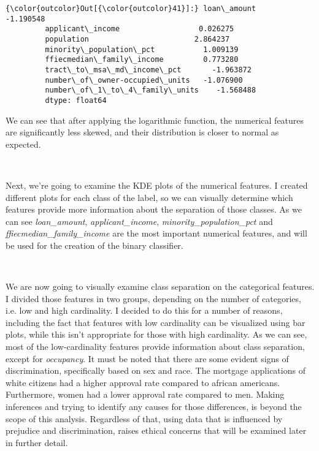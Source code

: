 \documentclass[11pt]{article}
\begin{document}
\begin{Verbatim}[commandchars=\\\{\}]
{\color{outcolor}Out[{\color{outcolor}41}]:} loan\_amount                      -1.190548
         applicant\_income                  0.026275
         population                        2.864237
         minority\_population\_pct           1.009139
         ffiecmedian\_family\_income         0.773280
         tract\_to\_msa\_md\_income\_pct       -1.963872
         number\_of\_owner-occupied\_units   -1.076900
         number\_of\_1\_to\_4\_family\_units    -1.568488
         dtype: float64
\end{Verbatim}
            
    We can see that after applying the logarithmic function, the numerical
features are significantly less skewed, and their distribution is closer
to normal as expected.

    \begin{center}
    \end{center}
    { \hspace*{\fill} \\}
    
    Next, we're going to examine the KDE plots of the numerical features. I
created different plots for each class of the label, so we can visually
determine which features provide more information about the separation
of those classes. As we can see \emph{loan\_amount},
\emph{applicant\_income}, \emph{minority\_population\_pct} and
\emph{ffiecmedian\_family\_income} are the most important numerical
features, and will be used for the creation of the binary classifier.

    \begin{center}
    \end{center}
    { \hspace*{\fill} \\}
    
    We are now going to visually examine class separation on the categorical
features. I divided those features in two groups, depending on the
number of categories, i.e. low and high cardinality. Ι decided to do
this for a number of reasons, including the fact that features with low
cardinality can be visualized using bar plots, while this isn't
appropriate for those with high cardinality. As we can see, most of the
low-cardinality features provide information about class separation,
except for \emph{occupancy}. It must be noted that there are some
evident signs of discrimination, specifically based on sex and race. The
mortgage applications of white citizens had a higher approval rate
compared to african americans. Furthermore, women had a lower approval
rate compared to men. Making inferences and trying to identify any
causes for those differences, is beyond the scope of this analysis.
Regardless of that, using data that is influenced by prejudice and
discrimination, raises ethical concerns that will be examined later in
further detail.
\end{document}
